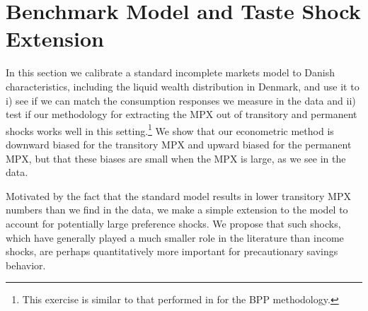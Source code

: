 \documentclass[titlepage]{\econtex}\newcommand{\texname}{ConsumptionHeterogeneity}
\begin{document}
\section{Benchmark Model and Taste Shock Extension} \label{model}
In this section we calibrate a standard incomplete markets model to Danish characteristics, including the liquid wealth distribution in Denmark, and use it to i) see if we can match the consumption responses we measure in the data and ii) test if our methodology for extracting the MPX out of transitory and permanent shocks works well in this setting.\footnote{This exercise is similar to that performed in \cite{kaplan_how_2010} for the BPP methodology.} We show that our econometric method is downward biased for the transitory MPX and upward biased for the permanent MPX, but that these biases are small when the MPX is large, as we see in the data.

Motivated by the fact that the standard model results in lower transitory MPX numbers than we find in the data, we make a simple extension to the model to account for potentially large preference shocks. We propose that such shocks, which have generally played a much smaller role in the literature than income shocks, are perhaps quantitatively more important for precautionary savings behavior.
\end{document}
